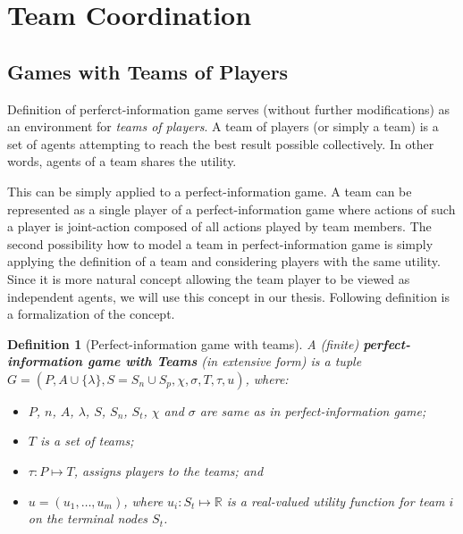 
\section{Team Coordination}

\subsection{Games with Teams of Players}

Definition of perferct-information game serves (without further modifications) as an
environment for \emph{teams of players}. A team of players (or simply a team) is a set of agents
attempting to reach the best result possible collectively. In other words, agents of a team
shares the utility. 

This can be simply applied to a perfect-information game. A team can be represented as a single
player of a perfect-information game where actions of such a player is joint-action composed of
all actions played by team members. The second possibility how to model a team in
perfect-information game is simply applying the definition of a team and considering players
with the same utility. Since it is more natural concept allowing the team player to be viewed as
independent agents, we will use this concept in our thesis. Following definition is a
formalization of the concept.


\newtheorem*{defpigt}{Definition}
\begin{defpigt}[Perfect-information game with teams]

A (finite) \textbf{perfect-information game with Teams} (in extensive form) is a tuple $G =
(P,A\cup\{\lambda\}, S=S_n\cup S_p, \chi, \sigma, T, \tau, u)$, where:


\begin{itemize}

\item $P$, $n$, $A$, $\lambda$, $S$, $S_n$, $S_t$, $\chi$ and $\sigma$ are same as in
perfect-information game;

\item $T$ is a set of teams;

\item $\tau: P \mapsto T$, assigns players to the teams; and

\item $u = (u_1,\ldots,u_m)$, where $u_i: S_t \mapsto \mathbb{R}$ is a real-valued utility
function for team $i$ on the terminal nodes $S_t$.



\end{itemize}

\end{defpigt}

